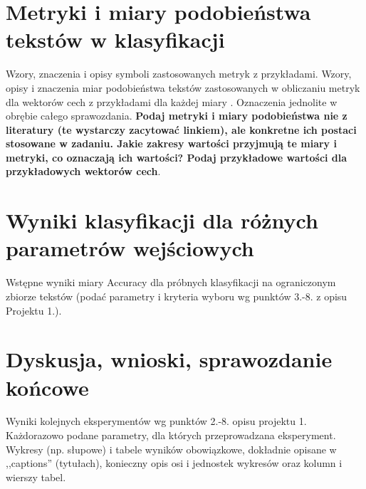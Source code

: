 \documentclass{article}
\begin{document}
\section{Metryki i miary podobieństwa tekstów w klasyfikacji}
Wzory, znaczenia i opisy symboli zastosowanych metryk z
przykładami. Wzory, opisy i znaczenia miar
podobieństwa tekstów zastosowanych w obliczaniu metryk dla wektorów cech z
przykładami dla każdej miary \cite{niewiadomski08}.  Oznaczenia jednolite w obrębie całego sprawozdania.  {\bf Podaj metryki i miary
podobieństwa nie z literatury (te wystarczy zacytować linkiem), ale konkretne ich
postaci stosowane w zadaniu. Jakie zakresy wartości przyjmują te miary i
metryki, co oznaczają ich wartości? Podaj przykładowe wartości dla przykładowych wektorów cech}. \\ 

\section{Wyniki klasyfikacji dla różnych parametrów wejściowych}
Wstępne wyniki miary Accuracy dla próbnych klasyfikacji na ograniczonym zbiorze tekstów (podać parametry i kryteria
wyboru wg punktów 3.-8. z opisu Projektu 1.). 


\section{Dyskusja, wnioski, sprawozdanie końcowe}

Wyniki kolejnych eksperymentów wg punktów 2.-8. opisu projektu 1.  Każdorazowo
podane parametry, dla których przeprowadzana eksperyment. 
Wykresy (np. słupowe) i tabele wyników
obowiązkowe, dokładnie opisane w ,,captions'' (tytułach), konieczny opis osi i
jednostek wykresów oraz kolumn i wierszy tabel.\\ 
\end{document}
